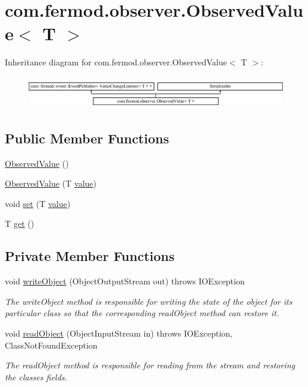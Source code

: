 \hypertarget{a00034}{}\section{com.\+fermod.\+observer.\+Observed\+Value$<$ T $>$}
\label{a00034}
Inheritance diagram for com.\+fermod.\+observer.\+Observed\+Value$<$ T $>$\+:\begin{figure}[H]
\begin{center}
\leavevmode
\includegraphics[height=1.424936cm]{db/df3/a00034}
\end{center}
\end{figure}
\subsection*{Public Member Functions}
\begin{DoxyCompactItemize}
\item 
\mbox{\hyperlink{a00034_a1df366b11a2df10c94ca920c63888417}{Observed\+Value}} ()
\item 
\mbox{\hyperlink{a00034_a4707162b16bd900e8ab85b67d45de32f}{Observed\+Value}} (T \mbox{\hyperlink{a00034_a947edfec1982817155067f495b0c8cf7}{value}})
\item 
void \mbox{\hyperlink{a00034_a40797fd2e2d1fb512ce6be7a35e67af2}{set}} (T \mbox{\hyperlink{a00034_a947edfec1982817155067f495b0c8cf7}{value}})
\item 
T \mbox{\hyperlink{a00034_aba42362d9ecdba6a831a148d182b6fe6}{get}} ()
\end{DoxyCompactItemize}
\subsection*{Private Member Functions}
\begin{DoxyCompactItemize}
\item 
void \mbox{\hyperlink{a00034_ae1d53d3762867c30fb44fdfdfa320d8c}{write\+Object}} (Object\+Output\+Stream out)  throws I\+O\+Exception 
\begin{DoxyCompactList}\small\item\em The {\ttfamily write\+Object} method is responsible for writing the state of the object for its particular class so that the corresponding {\ttfamily read\+Object} method can restore it. \end{DoxyCompactList}\item 
void \mbox{\hyperlink{a00034_afa9726a00fec7f70867cd34604a49842}{read\+Object}} (Object\+Input\+Stream in)  throws I\+O\+Exception, Class\+Not\+Found\+Exception 
\begin{DoxyCompactList}\small\item\em The {\ttfamily read\+Object} method is responsible for reading from the stream and restoring the classes fields. \end{DoxyCompactList}\end{DoxyCompactItemize}
